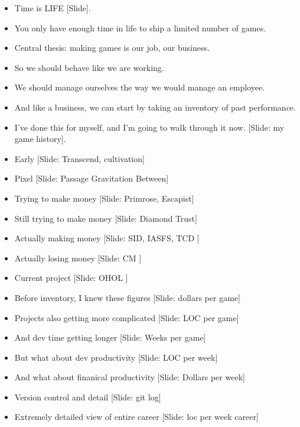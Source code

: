 \documentclass[12pt]{article}
\begin{document}
{\begin{itemize}
\item Time is LIFE [Slide].

\item You only have enough time in life to ship a limited number of games.

\item Central thesis:  making games is our job, our business.

\item So we should behave like we are working.

\item We should manage ourselves the way we would manage an employee.

\item And like a business, we can start by taking an inventory of past performance.

\item I've done this for myself, and I'm going to walk through it now. [Slide:  my game history].

\item Early [Slide:  Transcend, cultivation]
\item Pixel [Slide:  Passage Gravitation Between]
\item Trying to make money [Slide:  Primrose, Escapist]
\item Still trying to make money [Slide:  Diamond Trust]
\item Actually making money [Slide: SID, IASFS, TCD ]
\item Actually losing money [Slide: CM ]
\item Current project [Slide: OHOL ]

\item Before inventory, I knew these figures [Slide: dollars per game]

\item Projects also getting more complicated [Slide: LOC per game]


\item And dev time getting longer [Slide: Weeks per game]

\item But what about dev productivity [Slide: LOC per week]

\item And what about finanical productivity [Slide: Dollars per week]

\item Version control and detail [Slide: git log]

\item Extremely detailed view of entire career  [Slide: loc per week career]


\end{itemize}}
\end{document}
